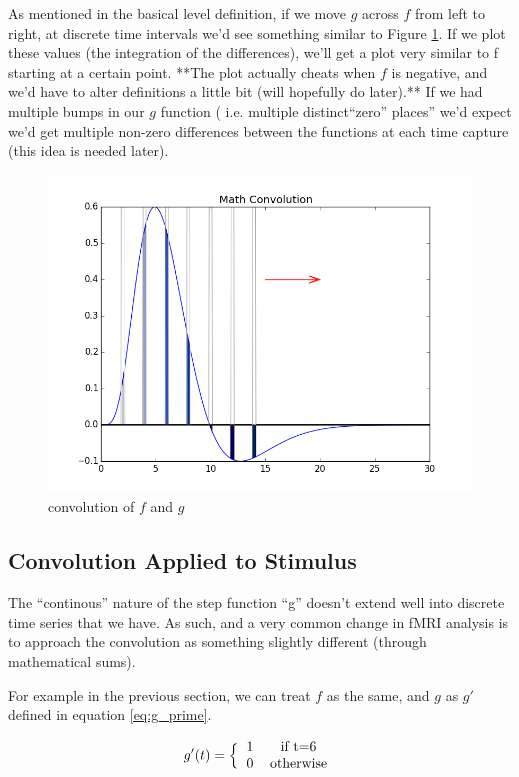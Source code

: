 \documentclass[11pt]{article}
\begin{document}
As mentioned in the basical level definition, if we move $g$ across $f$ from 
left to right, at discrete time intervals we'd see something similar to Figure 
\ref{fig:math}. If we plot these values (the integration of the differences), 
we'll get a plot very similar to f starting at a certain point.  **The plot 
actually cheats when $f$ is negative, and we'd have to alter definitions a 
little bit (will hopefully do later).**  If we had multiple bumps in our $g$ 
function ( i.e. multiple distinct``zero'' places'' we'd expect we'd get 
multiple non-zero differences between the functions at each time capture 
(this idea is needed later). 





\begin{figure}[ht]
	\centering
	\includegraphics[width=.5\linewidth]{images/math_convolved.png}
	\caption{convolution of $f$ and $g$}
	\label{fig:math}
\end{figure}






\subsection{Convolution Applied to Stimulus}

The ``continous'' nature of the step function ``g'' doesn't extend well into 
discrete time series that we have. As such, and a very common change in fMRI 
analysis is to approach the convolution as something slightly different 
(through mathematical sums).  

For example in the previous section, we can treat $f$ as the same, and $g$ as 
$g'$ defined in equation \ref{eq:g_prime}.

\begin{equation}\label{eq:g_prime}
 g'(t)=\Big \{ \begin{tabular}{l c}
 		1  & if t=6\\
 		0  & otherwise \\
 		\end{tabular} \end{equation}
\end{document}
